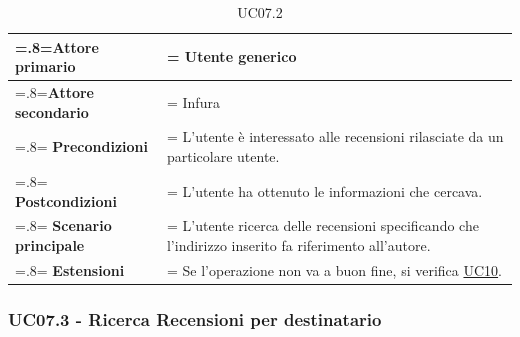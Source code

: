             \begin{table}[H]
                \centering
                \renewcommand{\arraystretch}{1.8}
                \renewcommand\tabularxcolumn[1]{m{#1}}
                \begin{tabularx}{0.9\textwidth} {
                    >{\hsize=.8\hsize\linewidth=\hsize}X
                    >{\hsize=1.2\hsize\linewidth=\hsize}X}
                    \hline
                    \textbf{Attore primario} & Utente generico \\
                    \hline
                    \textbf{Attore secondario} & Infura \\
                    \hline
                    \textbf{Precondizioni} & L'utente è interessato alle recensioni rilasciate da un particolare utente. \\
                    \hline
                    \textbf{Postcondizioni} & L'utente ha ottenuto le informazioni che cercava. \\
                    \hline
                    \textbf{Scenario principale} & L'utente ricerca delle recensioni specificando che l'indirizzo inserito fa riferimento all'autore.\\
                    \hline
                    \textbf{Estensioni} & Se l'operazione non va a buon fine, si verifica \hyperref[UC10]{UC10}. \\
                    \hline
                \end{tabularx}
                \caption{UC07.2}
            \end{table}

        \subsubsection{UC07.3 - Ricerca Recensioni per destinatario}
        \label{UC07.3}

